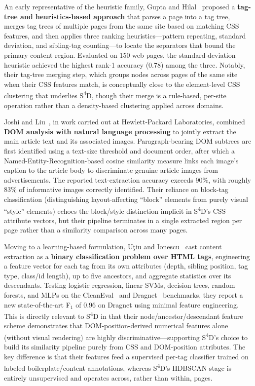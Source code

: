 An early representative of the heuristic family, Gupta and Hilal~\cite{gupta2011heuristic} proposed a \textbf{tag-tree and heuristics-based approach} that parses a page into a tag tree, merges tag trees of multiple pages from the same site based on matching CSS features, and then applies three ranking heuristics---pattern repeating, standard deviation, and sibling-tag counting---to locate the separators that bound the primary content region. Evaluated on 150 web pages, the standard-deviation heuristic achieved the highest rank-1 accuracy (0.78) among the three. Notably, their tag-tree merging step, which groups nodes across pages of the same site when their CSS features match, is conceptually close to the element-level CSS clustering that underlies S\textsuperscript{4}D, though their merge is a rule-based, per-site operation rather than a density-based clustering applied across domains.

Joshi and Liu~\cite{joshi2009domnlp}, in work carried out at Hewlett-Packard Laboratories, combined \textbf{DOM analysis with natural language processing} to jointly extract the main article text and its associated images. Paragraph-bearing DOM subtrees are first identified using a text-size threshold and document order, after which a Named-Entity-Recognition-based cosine similarity measure links each image's caption to the article body to discriminate genuine article images from advertisements. The reported text-extraction accuracy exceeds 90\%, with roughly 83\% of informative images correctly identified. Their reliance on block-tag classification (distinguishing layout-affecting ``block'' elements from purely visual ``style'' elements) echoes the block/style distinction implicit in S\textsuperscript{4}D's CSS attribute vectors, but their pipeline terminates in a single extracted region per page rather than a similarity comparison across many pages.

Moving to a learning-based formulation, U\c{t}iu and Ionescu~\cite{utiu2018domfeatures} cast content extraction as a \textbf{binary classification problem over HTML tags}, engineering a feature vector for each tag from its own attributes (depth, sibling position, tag type, class/id length), up to five ancestors, and aggregate statistics over its descendants. Testing logistic regression, linear SVMs, decision trees, random forests, and MLPs on the CleanEval~\cite{baroni2008cleaneval} and Dragnet~\cite{peters2013dragnet} benchmarks, they report a new state-of-the-art F$_1$ of 0.96 on Dragnet using minimal feature engineering. This is directly relevant to S\textsuperscript{4}D in that their node/ancestor/descendant feature scheme demonstrates that DOM-position-derived numerical features alone (without visual rendering) are highly discriminative---supporting S\textsuperscript{4}D's choice to build its similarity pipeline purely from CSS and DOM-position attributes. The key difference is that their features feed a supervised per-tag classifier trained on labeled boilerplate/content annotations, whereas S\textsuperscript{4}D's HDBSCAN stage is entirely unsupervised and operates across, rather than within, pages.

